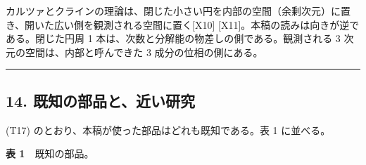 \documentclass[
  a4paper,
]{ltjsarticle}
\begin{document}
カルツァとクラインの理論は、閉じた小さい円を内部の空間（余剰次元）に置き、開いた広い側を観測される空間に置く{[}X10{]}
{[}X11{]}。本稿の読みは向きが逆である。閉じた円周 1
本は、次数と分解能の物差しの側である。観測される 3
次元の空間は、内部と呼んできた 3 成分の位相の側にある。

\begin{center}\rule{0.5\linewidth}{0.5pt}\end{center}

\subsection{14.
既知の部品と、近い研究}\label{ux65e2ux77e5ux306eux90e8ux54c1ux3068ux8fd1ux3044ux7814ux7a76}

(T17) のとおり、本稿が使った部品はどれも既知である。表 1 に並べる。

\textbf{表 1}　既知の部品。
\end{document}
